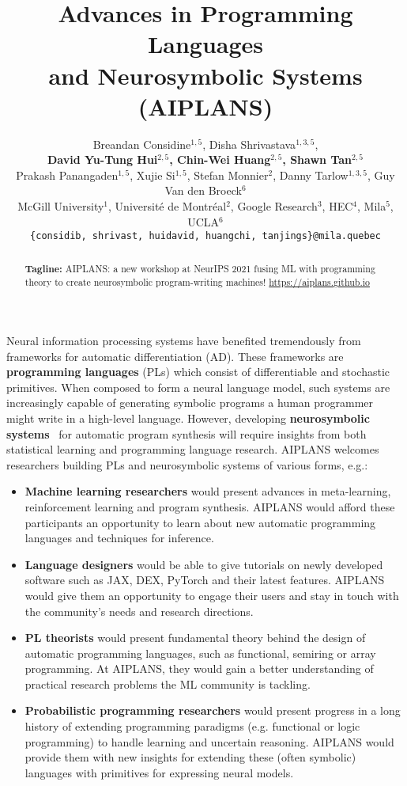 \documentclass{article}
\title{Advances in Programming Languages\\ and Neurosymbolic Systems (AIPLANS)}
\author{%
    Breandan Considine$^{1, 5}$, Disha Shrivastava$^{1, 3, 5}$, \\\textbf{David Yu-Tung Hui$^{2, 5}$, Chin-Wei Huang$^{2, 5}$, Shawn Tan$^{2, 5}$} \\
    Prakash Panangaden$^{1, 5}$, Xujie Si$^{1, 5}$, Stefan Monnier$^{2}$, Danny Tarlow$^{1, 3, 5}$, Guy Van den Broeck$^6$\\
    McGill University$^1$, Universit\'e de Montr\'eal$^2$, Google Research$^3$, HEC$^4$, Mila$^5$, UCLA$^6$ \\
    \texttt{\{considib, shrivast, huidavid, huangchi, tanjings\}@mila.quebec} \\
}
\begin{document}
    \maketitle
    \vspace{-0.5cm}
    \begin{abstract}
        \textbf{Tagline:} AIPLANS: a new workshop at NeurIPS 2021 fusing ML with programming theory to create neurosymbolic program-writing machines!  \url{https://aiplans.github.io} %
    \end{abstract}


    Neural information processing systems have benefited tremendously from frameworks for automatic differentiation (AD). These frameworks are \textbf{programming languages} (PLs) which consist of differentiable and stochastic primitives. When composed to form a neural language model, such systems are increasingly capable of generating symbolic programs a human programmer might write in a high-level language. However, developing \textbf{neurosymbolic systems}~\cite{wermter2001present} for automatic program synthesis will require insights from both statistical learning and programming language research. AIPLANS welcomes researchers building PLs and neurosymbolic systems of various forms, e.g.:
    \begin{itemize}
        \item \textbf{Machine learning researchers} would present advances in meta-learning, reinforcement learning and program synthesis. AIPLANS would afford these participants an opportunity to learn about new automatic programming languages and techniques for inference.
        \item \textbf{Language designers} would be able to give tutorials on newly developed software such as JAX, DEX, PyTorch and their latest features. AIPLANS would give them an opportunity to engage their users and stay in touch with the community's needs and research directions.
        \item \textbf{PL theorists} would present fundamental theory behind the design of automatic programming languages, such as functional, semiring or array programming. At AIPLANS, they would gain a better understanding of practical research problems the ML community is tackling.
        \item \textbf{Probabilistic programming researchers} would present progress in a long history of extending programming paradigms (e.g. functional or logic programming) to handle learning and uncertain reasoning. AIPLANS would provide them with new insights for extending these (often symbolic) languages with primitives for expressing neural models.
    \end{itemize}
\end{document}
